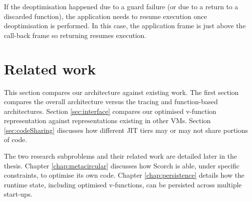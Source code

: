 \documentclass[a4paper,12pt,twoside]{../includes/ThesisStyle}
\begin{document}
If the deoptimisation happened due to a guard failure (or due to a return to a discarded function), the application needs to resume execution once deoptimisation is performed. In this case, the application frame is just above the call-back frame so returning resumes execution. %




\section{Related work}
\label{sec:relatedWorkArch}

This section compares our architecture against existing work. The first section compares the overall architecture versus the tracing and function-based architectures. Section \ref{sec:interface} compares our optimised v-function representation against representations existing in other VMs. Section \ref{sec:codeSharing} discusses how different JIT tiers may or may not share portions of code.

The two research subproblems and their related work are detailed later in the thesis. Chapter \ref{chap:metacircular} discusses how Scorch is able, under specific constraints, to optimise its own code. Chapter \ref{chap:persistence} details how the runtime state, including optimised v-functions, can be persisted across multiple start-ups.
\end{document}
